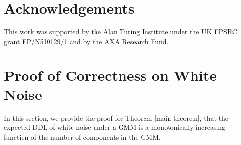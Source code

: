 \documentclass[a4paper,fleqn]{cas-sc}
\theoremstyle{remark}
\begin{document}
\section*{Acknowledgements}
This work was supported by the Alan Turing Institute under the UK EPSRC grant EP/N510129/1 and by the AXA Research Fund.

\printbibliography


\clearpage
\appendix
\section{Proof of Correctness on White Noise}
In this section, we provide the proof for Theorem \ref{main-theorem}, that the expected DDL of white noise under a GMM is a monotonically increasing function of the number of components in the GMM. 
\end{document}
